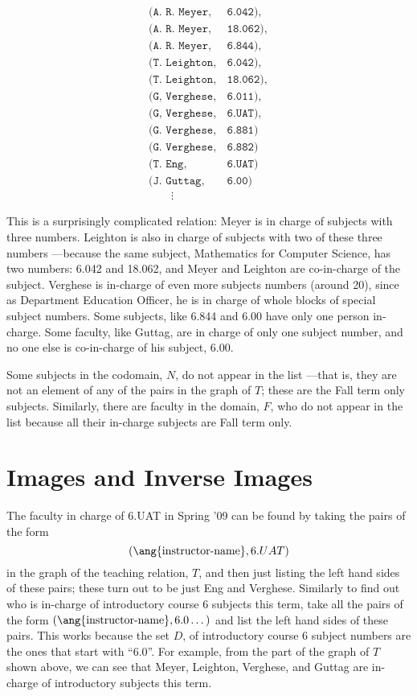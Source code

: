 \[\begin{array}{ll}
(\texttt{A. R. Meyer}, & \texttt{6.042}),\\
(\texttt{A. R. Meyer}, & \texttt{18.062}),\\
(\texttt{A. R. Meyer}, & \texttt{6.844}),\\
(\texttt{T. Leighton}, & \texttt{6.042}),\\
(\texttt{T. Leighton}, & \texttt{18.062}),\\
(\texttt{G, Verghese}, & \texttt{6.011}),\\
(\texttt{G, Verghese}, & \texttt{6.UAT}),\\
(\texttt{G. Verghese}, & \texttt{6.881})\\
(\texttt{G. Verghese}, & \texttt{6.882})\\
(\texttt{T. Eng},      & \texttt{6.UAT})\\
(\texttt{J. Guttag},  & \texttt{6.00})\\
\qquad \vdots
\end{array}\]

This is a surprisingly complicated relation: Meyer is in charge of
subjects with three numbers.  Leighton is also in charge of subjects with
two of these three numbers ---because the same subject, Mathematics for
Computer Science, has two numbers: 6.042 and 18.062, and Meyer and
Leighton are co-in-charge of the subject.  Verghese is in-charge of even
more subjects numbers (around 20), since as Department Education Officer,
he is in charge of whole blocks of special subject numbers.  Some
subjects, like 6.844 and 6.00 have only one person in-charge.  Some
faculty, like Guttag, are in charge of only one subject number, and no
one else is co-in-charge of his subject, 6.00.

Some subjects in the codomain, $N$, do not appear in the list ---that is,
they are not an element of any of the pairs in the graph of $T$; these are
the Fall term only subjects.  Similarly, there are faculty in the domain,
$F$, who do not appear in the list because all their in-charge subjects
are Fall term only.

\section{Images and Inverse Images}

The faculty in charge of 6.UAT in Spring '09 can be found by taking the
pairs of the form
\[
(\ang{\text{instructor-name}}, 6.UAT)
\]
in the graph of the teaching relation, $T$, and then just listing the left
hand sides of these pairs; these turn out to be just Eng and Verghese.
Similarly to find out who is in-charge of introductory course 6 subjects
this term, take all the pairs of the form $(\ang{\text{instructor-name}},
6.0\dots)$ and list the left hand sides of these pairs.  This works because
the set $D$, of introductory course 6 subject numbers are the ones that
start with ``6.0''.  For example, from the part of the graph of $T$ shown
above, we can see that Meyer, Leighton, Verghese, and Guttag are in-charge
of introductory subjects this term.

